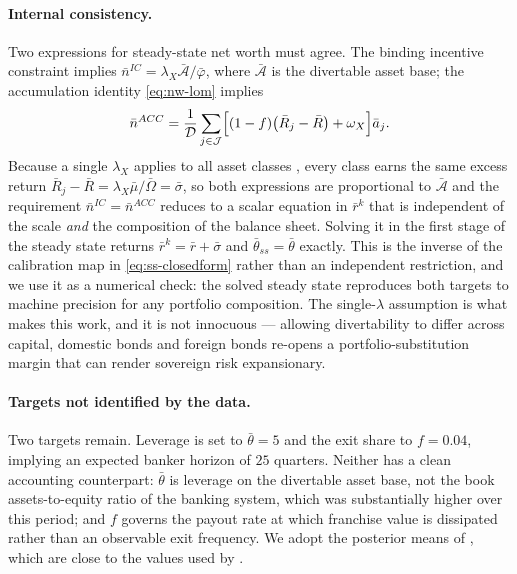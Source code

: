 \paragraph{Internal consistency.}
Two expressions for steady-state net worth must agree. The binding incentive
constraint implies $\bar n^{IC}=\lambda_X\bar{\mathcal{A}}/\bar\varphi$, where
$\bar{\mathcal{A}}$ is the divertable asset base; the accumulation identity
\eqref{eq:nw-lom} implies
\begin{equation}
\bar n^{ACC}
=\frac{1}{\mathcal{D}}
 \sum_{j\in\mathcal{J}}\Bigl[(1-f)\bigl(\bar R_{j}-\bar R\bigr)+\omega_X\Bigr]\bar a_j .
\label{eq:ss-nw}
\end{equation}
Because a single $\lambda_X$ applies to all asset classes
\citep[eq.~3]{bocola2016}, every class earns the same excess return
$\bar R_j-\bar R=\lambda_X\bar\mu/\bar\Omega=\bar\sigma$, so both expressions are
proportional to $\bar{\mathcal{A}}$ and the requirement $\bar n^{IC}=\bar
n^{ACC}$ reduces to a scalar equation in $\bar r^{k}$ that is independent of the
scale \emph{and} the composition of the balance sheet. Solving it in the first
stage of the steady state returns $\bar r^{k}=\bar r+\bar\sigma$ and
$\bar\theta_{ss}=\bar\theta$ exactly. This is the inverse of the calibration map
in \eqref{eq:ss-closedform} rather than an independent restriction, and we use it
as a numerical check: the solved steady state reproduces both targets to machine
precision for any portfolio composition. The single-$\lambda$ assumption is what
makes this work, and it is not innocuous --- allowing divertability to differ
across capital, domestic bonds and foreign bonds re-opens a
portfolio-substitution margin that can render sovereign risk expansionary.

\paragraph{Targets not identified by the data.}
Two targets remain. Leverage is set to $\bar\theta=5$ and the exit share to
$f=0.04$, implying an expected banker horizon of $25$ quarters. Neither has a
clean accounting counterpart: $\bar\theta$ is leverage on the divertable asset
base, not the book assets-to-equity ratio of the banking system, which was
substantially higher over this period; and $f$ governs the payout rate at which
franchise value is dissipated rather than an observable exit frequency. We adopt
the posterior means of \citet{bocola2016}, which are close to the values used by
\citet{gertlerkiyotaki2010}.

